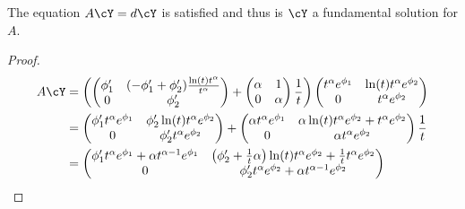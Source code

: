 \begin{lem}
  The equation $A\cY=d\cY$ is satisfied and thus is $\cY$ a fundamental solution
  for $A$.
\end{lem}
\begin{proof}
  \begin{align*}
    A\cY&=\left( \begin{pmatrix}
      \phi_1' &
      (-\phi_1'+\phi_2')\frac{\ln(t)t^\alpha}{t^\alpha}
      \\0 & \phi_2'
    \end{pmatrix} 
    +
    \begin{pmatrix} \alpha & 1 \\ 0 & \alpha \end{pmatrix} \frac{1}{t}
    \right)
    \begin{pmatrix}
      t^\alpha e^{\phi_1} & \ln(t)t^\alpha e^{\phi_2}
      \\0 & t^\alpha e^{\phi_2}
    \end{pmatrix}
    \\&=\begin{pmatrix}
      \phi_1' t^\alpha e^{\phi_1}
      & \phi_2'\ln(t)t^\alpha e^{\phi_2}
      \\0 & \phi_2' t^\alpha e^{\phi_2}
    \end{pmatrix}
    +
    \begin{pmatrix}
      \alpha t^\alpha e^{\phi_1} &
      \alpha\ln(t)t^\alpha e^{\phi_2} + t^\alpha e^{\phi_2}
      \\0 & \alpha t^\alpha e^{\phi_2}
    \end{pmatrix}
    \frac{1}{t}
    \\&=\begin{pmatrix}
      \phi_1' t^\alpha e^{\phi_1} +\alpha t^{\alpha-1} e^{\phi_1}
      &
      \left(\phi_2'+\frac{1}{t}\alpha\right)
      \ln(t)t^\alpha e^{\phi_2}
      +\frac{1}{t} t^\alpha e^{\phi_2}
      \\0 & \phi_2' t^\alpha e^{\phi_2}+\alpha t^{\alpha-1} e^{\phi_2}
    \end{pmatrix}

\end{align*}
\end{proof}
